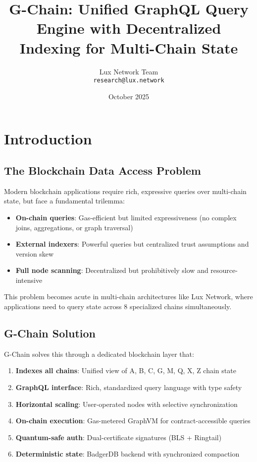 \documentclass[11pt,a4paper]{article}
\title{G-Chain: Unified GraphQL Query Engine with Decentralized Indexing for Multi-Chain State}
\author{
Lux Network Team\\
\texttt{research@lux.network}
}
\date{October 2025}
\begin{document}
\maketitle

\section{Introduction}

\subsection{The Blockchain Data Access Problem}

Modern blockchain applications require rich, expressive queries over multi-chain state, but face a fundamental trilemma:

\begin{itemize}
\item \textbf{On-chain queries}: Gas-efficient but limited expressiveness (no complex joins, aggregations, or graph traversal)
\item \textbf{External indexers}: Powerful queries but centralized trust assumptions and version skew
\item \textbf{Full node scanning}: Decentralized but prohibitively slow and resource-intensive
\end{itemize}

This problem becomes acute in multi-chain architectures like Lux Network, where applications need to query state across 8 specialized chains simultaneously.

\subsection{G-Chain Solution}

G-Chain solves this through a dedicated blockchain layer that:

\begin{enumerate}
\item \textbf{Indexes all chains}: Unified view of A, B, C, G, M, Q, X, Z chain state
\item \textbf{GraphQL interface}: Rich, standardized query language with type safety
\item \textbf{Horizontal scaling}: User-operated nodes with selective synchronization
\item \textbf{On-chain execution}: Gas-metered GraphVM for contract-accessible queries
\item \textbf{Quantum-safe auth}: Dual-certificate signatures (BLS + Ringtail)
\item \textbf{Deterministic state}: BadgerDB backend with synchronized compaction
\end{enumerate}
\end{document}
